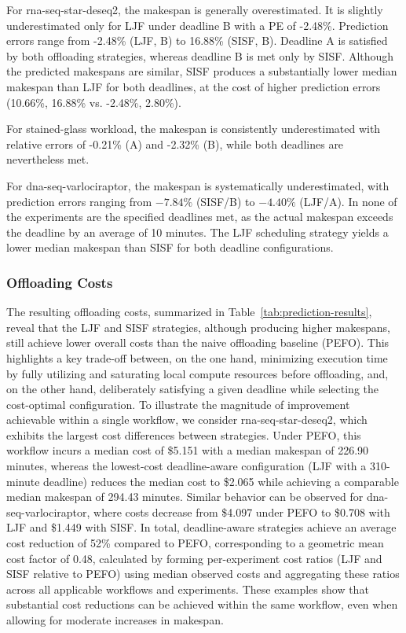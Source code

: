 For rna-seq-star-deseq2, the makespan is generally overestimated. It is slightly underestimated only for LJF under deadline B with a PE of -2.48\%. Prediction errors range from -2.48\% (LJF, B) to 16.88\% (SISF, B). Deadline A is satisfied by both offloading strategies, whereas deadline B is met only by SISF. Although the predicted makespans are similar, SISF produces a substantially lower median makespan than LJF for both deadlines, at the cost of higher prediction errors (10.66\%, 16.88\% vs. -2.48\%, 2.80\%).

For stained-glass workload, the makespan is consistently underestimated with relative errors of -0.21\% (A) and -2.32\% (B), while both deadlines are nevertheless met. 

For dna-seq-varlociraptor, the makespan is systematically underestimated, with prediction errors ranging from \(-7.84\%\) (SISF/B) to \(-4.40\%\) (LJF/A). In none of the experiments are the specified deadlines met, as the actual makespan exceeds the deadline by an average of 10 minutes. The LJF scheduling strategy yields a lower median makespan than SISF for both deadline configurations.

\subsubsection{Offloading Costs}

The resulting offloading costs, summarized in Table~\ref{tab:prediction-results}, reveal that the LJF and SISF strategies, although producing higher makespans, still achieve lower overall costs than the naive offloading baseline (PEFO). This highlights a key trade-off between, on the one hand, minimizing execution time by fully utilizing and saturating local compute resources before offloading, and, on the other hand, deliberately satisfying a given deadline while selecting the cost-optimal configuration.
To illustrate the magnitude of improvement achievable within a single workflow, we consider rna-seq-star-deseq2, which exhibits the largest cost differences between strategies. Under PEFO, this workflow incurs a median cost of \$5.151 with a median makespan of 226.90 minutes, whereas the lowest-cost deadline-aware configuration (LJF with a 310-minute deadline) reduces the median cost to \$2.065 while achieving a comparable median makespan of 294.43 minutes. Similar behavior can be observed for dna-seq-varlociraptor, where costs decrease from \$4.097 under PEFO to \$0.708 with LJF and \$1.449 with SISF. In total, deadline-aware strategies achieve an average cost reduction of 52\% compared to PEFO, corresponding to a geometric mean cost factor of 0.48, calculated by forming per-experiment cost ratios (LJF and SISF relative to PEFO) using median observed costs and aggregating these ratios across all applicable workflows and experiments. These examples show that substantial cost reductions can be achieved within the same workflow, even when allowing for moderate increases in makespan.

